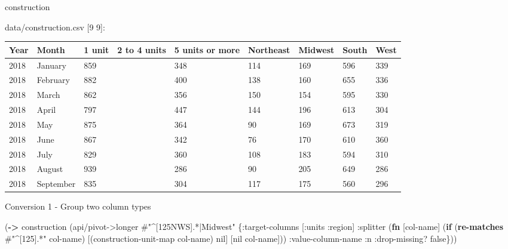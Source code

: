 \documentclass[]{article}
\newenvironment{Shaded}{\begin{snugshade}}{\end{snugshade}}
\newcommand{\AttributeTok}[1]{\textcolor[rgb]{0.77,0.63,0.00}{#1}}
\newcommand{\KeywordTok}[1]{\textcolor[rgb]{0.13,0.29,0.53}{\textbf{#1}}}
\newcommand{\NormalTok}[1]{#1}
\newcommand{\SpecialStringTok}[1]{\textcolor[rgb]{0.31,0.60,0.02}{#1}}
\newcommand{\VariableTok}[1]{\textcolor[rgb]{0.00,0.00,0.00}{#1}}
\begin{document}
\begin{Shaded}
\begin{Highlighting}[]
\NormalTok{construction}
\end{Highlighting}
\end{Shaded}

data/construction.csv {[}9 9{]}:

\begin{longtable}[]{@{}lllllllll@{}}
\toprule
Year & Month & 1 unit & 2 to 4 units & 5 units or more & Northeast &
Midwest & South & West\tabularnewline
\midrule
\endhead
2018 & January & 859 & & 348 & 114 & 169 & 596 & 339\tabularnewline
2018 & February & 882 & & 400 & 138 & 160 & 655 & 336\tabularnewline
2018 & March & 862 & & 356 & 150 & 154 & 595 & 330\tabularnewline
2018 & April & 797 & & 447 & 144 & 196 & 613 & 304\tabularnewline
2018 & May & 875 & & 364 & 90 & 169 & 673 & 319\tabularnewline
2018 & June & 867 & & 342 & 76 & 170 & 610 & 360\tabularnewline
2018 & July & 829 & & 360 & 108 & 183 & 594 & 310\tabularnewline
2018 & August & 939 & & 286 & 90 & 205 & 649 & 286\tabularnewline
2018 & September & 835 & & 304 & 117 & 175 & 560 & 296\tabularnewline
\bottomrule
\end{longtable}

Conversion 1 - Group two column types

\begin{Shaded}
\begin{Highlighting}[]
\NormalTok{(}\KeywordTok{->}\NormalTok{ construction}
\NormalTok{    (api/pivot->longer }\SpecialStringTok{#"^[125NWS].*|Midwest"}\NormalTok{ \{}\AttributeTok{:target-columns}\NormalTok{ [}\AttributeTok{:units} \AttributeTok{:region}\NormalTok{]}
                                               \AttributeTok{:splitter}\NormalTok{ (}\KeywordTok{fn}\NormalTok{ [col-name]}
\NormalTok{                                                           (}\KeywordTok{if}\NormalTok{ (}\KeywordTok{re-matches} \SpecialStringTok{#"^[125].*"}\NormalTok{ col-name)}
\NormalTok{                                                             [(construction-unit-map col-name) }\VariableTok{nil}\NormalTok{]}
\NormalTok{                                                             [}\VariableTok{nil}\NormalTok{ col-name]))}
                                               \AttributeTok{:value-column-name} \AttributeTok{:n}
                                               \AttributeTok{:drop-missing}\NormalTok{? }\VariableTok{false}\NormalTok{\}))}
\end{Highlighting}
\end{Shaded}
\end{document}
